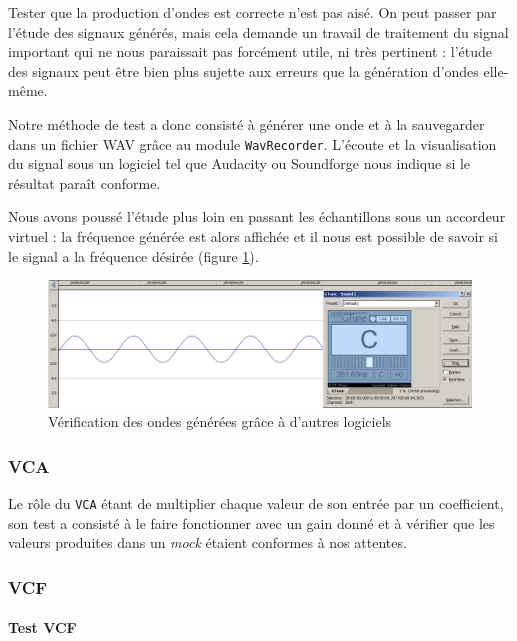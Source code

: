 Tester que la production d'ondes est correcte n'est pas aisé. On
peut passer par l'étude des signaux générés, mais cela demande un
travail de traitement du signal important qui ne nous paraissait
pas forcément utile, ni très pertinent : l'étude des signaux peut
être bien plus sujette aux erreurs que la génération d'ondes
elle-même.

Notre méthode de test a donc consisté à générer une onde et à la
sauvegarder dans un fichier WAV grâce au module \verb!WavRecorder!.
L'écoute et la visualisation du signal sous un logiciel tel que
Audacity ou Soundforge nous indique si le résultat paraît
conforme.

Nous avons poussé l'étude plus loin en passant les échantillons
sous un accordeur virtuel : la fréquence générée est alors affichée
et il nous est possible de savoir si le signal a la fréquence
désirée (figure \ref{fig:accordeur}).

\begin{figure}[ht]
\centering
\includegraphics[width=16cm]{../img/png/testWaveGeneratorSinus.png}
\caption{Vérification des ondes générées grâce à d'autres logiciels}
\label{fig:accordeur}
\end{figure}

\subsubsection{VCA}
Le rôle du \verb!VCA! étant de multiplier chaque valeur de son entrée par un coefficient, son test a consisté à le faire fonctionner avec un gain donné et à vérifier que les valeurs produites dans un \emph{mock} étaient conformes à nos attentes.

\subsubsection{VCF}

\paragraph{Test VCF}

